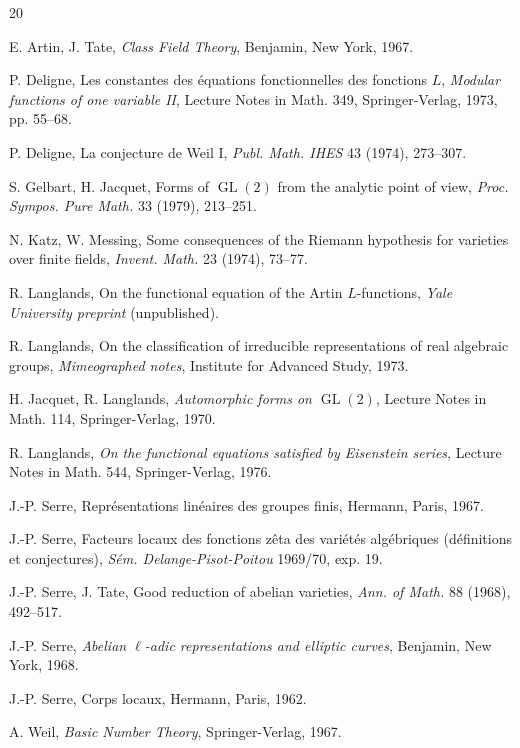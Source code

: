 \documentclass[11pt]{amsart}
\theoremstyle{plain}
\theoremstyle{definition}
\DeclareMathOperator{\GL}{GL}
\begin{document}
\begin{thebibliography}{20}

 E. Artin, J. Tate, \textit{Class Field Theory}, Benjamin, New York, 1967.

 P. Deligne, Les constantes des \'equations fonctionnelles des fonctions $L$, \textit{Modular functions of one variable II}, Lecture Notes in Math. 349, Springer-Verlag, 1973, pp. 55--68.

 P. Deligne, La conjecture de Weil I, \textit{Publ. Math. IHES} 43 (1974), 273--307.

 S. Gelbart, H. Jacquet, Forms of $\GL(2)$ from the analytic point of view, \textit{Proc. Sympos. Pure Math.} 33 (1979), 213--251.

 N. Katz, W. Messing, Some consequences of the Riemann hypothesis for varieties over finite fields, \textit{Invent. Math.} 23 (1974), 73--77.

 R. Langlands, On the functional equation of the Artin $L$-functions, \textit{Yale University preprint} (unpublished).

 R. Langlands, On the classification of irreducible representations of real algebraic groups, \textit{Mimeographed notes}, Institute for Advanced Study, 1973.

 H. Jacquet, R. Langlands, \textit{Automorphic forms on $\GL(2)$}, Lecture Notes in Math. 114, Springer-Verlag, 1970.

 R. Langlands, \textit{On the functional equations satisfied by Eisenstein series}, Lecture Notes in Math. 544, Springer-Verlag, 1976.

 J.-P. Serre, Repr\'esentations lin\'eaires des groupes finis, Hermann, Paris, 1967.

 J.-P. Serre, Facteurs locaux des fonctions z\^eta des vari\'et\'es alg\'ebriques (d\'efinitions et conjectures), \textit{S\'em. Delange-Pisot-Poitou} 1969/70, exp. 19.

 J.-P. Serre, J. Tate, Good reduction of abelian varieties, \textit{Ann. of Math.} 88 (1968), 492--517.

 J.-P. Serre, \textit{Abelian $\ell$-adic representations and elliptic curves}, Benjamin, New York, 1968.

 J.-P. Serre, Corps locaux, Hermann, Paris, 1962.

 A. Weil, \textit{Basic Number Theory}, Springer-Verlag, 1967.


\end{thebibliography}
\end{document}

